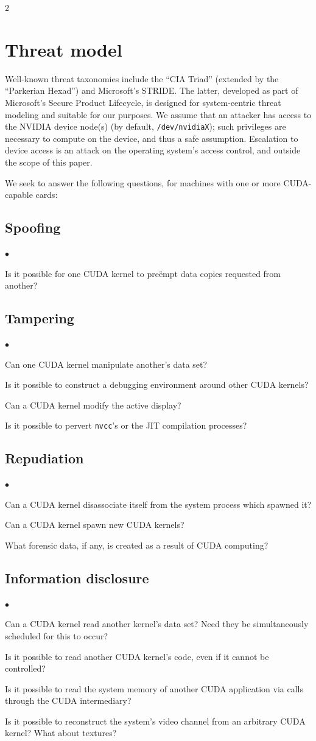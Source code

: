 \documentclass[letterpaper,10pt]{article}
\newcommand{\squishlist}{\begin{list}{$\bullet$}
  {\setlength{\itemsep}{0pt}
    \setlength{\parsep}{3pt}
    \setlength{\topsep}{3pt}
    \setlength{\partopsep}{0pt}
    \setlength{\leftmargin}{1.5em}
    \setlength{\labelwidth}{1em}
    \setlength{\labelsep}{0.5em}
  } }
\newcommand{\squishend}{\end{list}}
\begin{document}
\begin{multicols}{2}
\section{Threat model}
Well-known threat taxonomies include the ``CIA Triad'' (extended by the
``Parkerian Hexad\cite{sechandbook}'') and Microsoft's STRIDE\@. The latter, developed as part of
Microsoft's Secure Product Lifecycle, is designed for system-centric threat
modeling and suitable for our purposes. We assume that an attacker has access
to the NVIDIA device node(s) (by default, \texttt{/dev/nvidiaX}); such privileges
are necessary to compute on the device, and thus a safe assumption. Escalation
to device access is an attack on the operating system's access control, and
outside the scope of this paper.

We seek to answer the following questions, for machines with one or more CUDA-capable
cards:
\subsection{Spoofing}
\squishlist
\item Is it possible for one CUDA kernel to pre\"empt data copies requested
from another?
\squishend
\subsection{Tampering}
\squishlist
\item Can one CUDA kernel manipulate another's data set?
\item Is it possible to construct a debugging environment around other CUDA kernels?
\item Can a CUDA kernel modify the active display?
\item Is it possible to pervert \texttt{nvcc}'s or the JIT compilation processes?
\squishend
\subsection{Repudiation}
\squishlist
\item Can a CUDA kernel disassociate itself from the system process which spawned it?
\item Can a CUDA kernel spawn new CUDA kernels?
\item What forensic data, if any, is created as a result of CUDA computing?
\squishend
\subsection{Information disclosure}
\squishlist
\item Can a CUDA kernel read another kernel's data set? Need they be simultaneously
scheduled for this to occur?
\item Is it possible to read another CUDA kernel's code, even if it cannot be
controlled?
\item Is it possible to read the system memory of another CUDA application via
calls through the CUDA intermediary?
\item Is it possible to reconstruct the system's video channel from an arbitrary
CUDA kernel? What about textures?
\squishend

\end{multicols}
\end{document}

